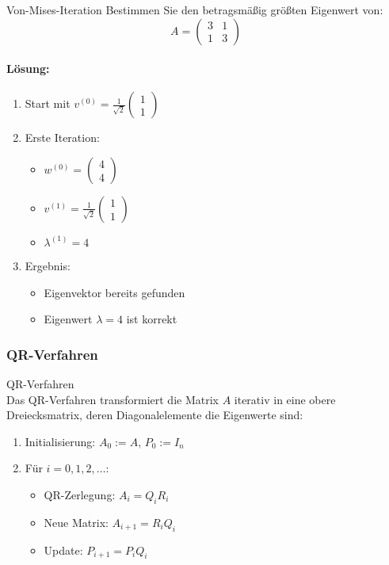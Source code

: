 \begin{example2}{Von-Mises-Iteration}
Bestimmen Sie den betragsmäßig größten Eigenwert von:
$$A = \begin{pmatrix}
3 & 1 \\
1 & 3
\end{pmatrix}$$

\paragraph{Lösung:}
\begin{enumerate}
    \item Start mit $v^{(0)} = \frac{1}{\sqrt{2}}\begin{pmatrix} 1 \\ 1 \end{pmatrix}$
    
    \item Erste Iteration:
    \begin{itemize}
        \item $w^{(0)} = \begin{pmatrix} 4 \\ 4 \end{pmatrix}$
        \item $v^{(1)} = \frac{1}{\sqrt{2}}\begin{pmatrix} 1 \\ 1 \end{pmatrix}$
        \item $\lambda^{(1)} = 4$
    \end{itemize}
    
    \item Ergebnis:
    \begin{itemize}
        \item Eigenvektor bereits gefunden
        \item Eigenwert $\lambda = 4$ ist korrekt
    \end{itemize}
\end{enumerate}
\end{example2}

\subsubsection{QR-Verfahren}

\begin{concept}{QR-Verfahren}\\
Das QR-Verfahren transformiert die Matrix $A$ iterativ in eine obere Dreiecksmatrix, deren Diagonalelemente die Eigenwerte sind:
\begin{enumerate}
    \item Initialisierung: $A_0 := A$, $P_0 := I_n$
    \item Für $i = 0,1,2,\ldots$:
    \begin{itemize}
        \item QR-Zerlegung: $A_i = Q_iR_i$
        \item Neue Matrix: $A_{i+1} = R_iQ_i$
        \item Update: $P_{i+1} = P_iQ_i$
    \end{itemize}
\end{enumerate}
\end{concept}


